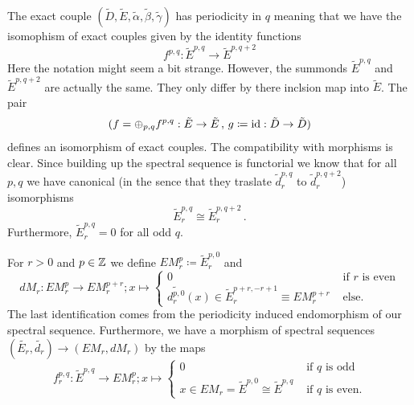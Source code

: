 \begin{corollary}[Periodicity in $q$]
	The exact couple $(\tilde{D},\tilde{E},\tilde{\alpha},\tilde{\beta},\tilde{\gamma})$ has periodicity in $q$ meaning that we have the isomophism of exact couples given by the identity functions
	\begin{equation*}
		f^{p,q}:\tilde{E}^{p,q}\to \tilde{E}^{p,q+2}
	\end{equation*}
	Here the notation might seem a bit strange. However, the summonds $\tilde{E}^{p,q}$ and $\tilde{E}^{p,q+2}$ are actually the same. They only differ by there inclsion map into $\tilde{E}$. The pair 
	\begin{equation*}
	(f=\oplus_{p,q}f^{p,q}:\tilde{E}\to \tilde{E}\,,\, g\coloneq \operatorname{\mathrm{id}}: \tilde{D}\to \tilde{D})
	\end{equation*} defines an isomorphism of exact couples. The compatibility with morphisms is clear. Since building up the spectral sequence is functorial we know that for all $p,q$ we have canonical (in the sence that they traslate $\tilde{d}_r^{p,q}$ to $\tilde{d}_r^{p,q+2}$) isomorphisms
	\begin{equation*}
		\tilde{E}_r^{p,q}\cong \tilde{E}_{r}^{p,q+2}\,.
	\end{equation*} Furthermore, $\tilde{E}_r^{p,q}=0$ for all odd $q$.
\end{corollary}

\begin{definition}
	For $r>0$ and $p\in \mathbb{Z}$ we define $EM_r^p\coloneq\tilde{E}^{p,0}_r$ and
	\begin{equation*}
		dM_r:EM_r^p\to EM_r^{p+r}; x\mapsto
		\begin{cases}
			0&\text{ if $r$ is even}\\
			\tilde{d_r^{p,0}}(x)\in \tilde{E}_r^{p+r,-r+1}\equiv EM_r^{p+r}&\text{ else. }
		\end{cases}
	\end{equation*} The last identification comes from the periodicity induced endomorphism of our spectral sequence. Furthermore, we have a morphism of spectral sequences $(\tilde{E_r},\tilde{d_r})\to (EM_r,dM_r)$ by the maps
	\begin{equation*}
		f_r^{p,q}:\tilde{E}^{p,q} \to EM^p_r; x\mapsto
		\begin{cases}
			0 & \text{ if $q$ is odd}\\
			x \in EM_r=\tilde{E}^{p,0}\cong \tilde{E}^{p,q} &\text{ if $q$ is even.}
		\end{cases}
	\end{equation*}
\end{definition}


